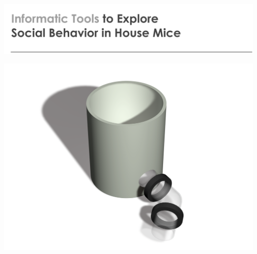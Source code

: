\documentclass[a4paper,10pt,twoside,headings=small,bibliography=totocnumbered,headsepline]{scrartcl}
\begin{document}

\begin{titlepage}
\begin{flushleft}
\includegraphics[width=\textwidth]{assets/pdf/title_header.pdf}
\end{flushleft}
\vspace{2cm}
\begin{center}
\includegraphics[width=\textwidth]{assets/pdf/box_title.pdf}
\end{center}


\vfill


\end{titlepage}
\end{document}
